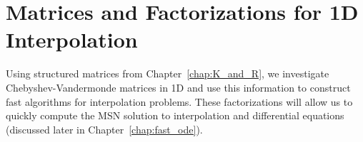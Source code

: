 \chapter{\CV{} Matrices and Factorizations for 1D Interpolation}
\label{chap:CV_mat_1D_I}

Using structured matrices from Chapter~\ref{chap:K_and_R},
we investigate Chebyshev-Vandermonde matrices
in 1D and use this information to construct
fast algorithms for interpolation problems.
These factorizations will allow us to quickly compute
the MSN solution to interpolation and differential equations
(discussed later in Chapter~\ref{chap:fast_ode}).























